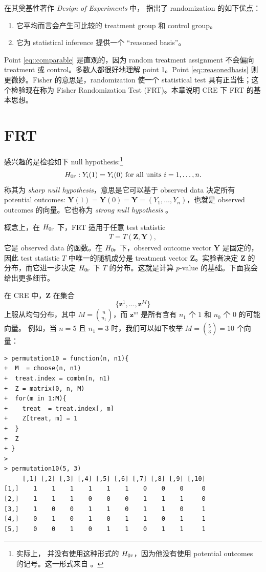 在其奠基性著作 {\it Design of Experiments} 中，\citet{Fisher:1935} 指出了 randomization 的如下优点：
\begin{enumerate}
[(1)]
\item\label{eq::comparable}
它平均而言会产生可比较的 treatment group 和 control group。

\item\label{eq::reasonedbasis}
它为 statistical inference 提供一个 ``reasoned basis''。
 \end{enumerate}
 
 
Point \ref{eq::comparable} 是直观的，因为 random treatment assignment 不会偏向 treatment 或 control。多数人都很好地理解 point 1。Point \ref{eq::reasonedbasis} 则更微妙。Fisher 的意思是，randomization 使一个 statistical test 具有正当性；这个检验现在称为 Fisher Randomization Test (FRT)。本章说明 CRE 下 FRT 的基本思想。


\section{FRT}
\label{sec::frt-basics}

\citet{Fisher:1935} 感兴趣的是检验如下 null hypothesis:\footnote{实际上，\citet{Fisher:1935} 并没有使用这种形式的 $H_{0\textsc{f}}$，因为他没有使用 potential outcomes 的记号。这一形式来自 \citet{Rubin:1980}。}
$$
H_{0\textsc{f}}: Y_i(1) = Y_i(0) \text{ for all units } i=1,\ldots, n.
$$
\citet{Rubin:1980} 称其为 {\it sharp null hypothesis}，意思是它可以基于 observed data 决定所有 potential outcomes: $\boldsymbol{Y}(1) = \boldsymbol{Y}(0) =  \boldsymbol{Y} = (Y_1, \ldots, Y_n)$，也就是 observed outcomes 的向量。它也称为 {\it strong null hypothesis} \citep[e.g.,][]{wu2018randomization}。


概念上，在 $H_{0\textsc{f}}$ 下，FRT 适用于任意 test statistic
\begin{eqnarray}\label{eq::teststatistic}
T = T( \boldsymbol{Z}, \boldsymbol{Y})  ,
\end{eqnarray}
它是 observed data 的函数。在 $H_{0\textsc{f}}$ 下，observed outcome vector $\boldsymbol{Y}$ 是固定的，因此 test statistic $T$ 中唯一的随机成分是 treatment vector $\boldsymbol{Z}$。实验者决定 $\boldsymbol{Z}$ 的分布，而它进一步决定 $H_{0\textsc{f}}$ 下 $T$ 的分布。这就是计算 $p$-value 的基础。下面我会给出更多细节。


在 CRE 中，$\boldsymbol{Z}$ 在集合
$$
\{  \boldsymbol{z}^1, \ldots, \boldsymbol{z}^M  \}
$$
上服从均匀分布，其中 $M = \binom{n}{n_1}$，而 $ \boldsymbol{z}^m$ 是所有含有 $n_1$ 个 $1$ 和 $n_0$ 个 $0$ 的可能向量。
例如，当 $n=5$ 且 $n_1=3$ 时，我们可以如下枚举 $M = \binom{5}{3} = 10$ 个向量：
\begin{lstlisting}
> permutation10 = function(n, n1){
+  M  = choose(n, n1)
+  treat.index = combn(n, n1)
+  Z = matrix(0, n, M)
+  for(m in 1:M){
+    treat  = treat.index[, m]
+    Z[treat, m] = 1
+  }
+  Z
+ }
> 
> permutation10(5, 3)
     [,1] [,2] [,3] [,4] [,5] [,6] [,7] [,8] [,9] [,10]
[1,]    1    1    1    1    1    1    0    0    0     0
[2,]    1    1    1    0    0    0    1    1    1     0
[3,]    1    0    0    1    1    0    1    1    0     1
[4,]    0    1    0    1    0    1    1    0    1     1
[5,]    0    0    1    0    1    1    0    1    1     1
\end{lstlisting}

